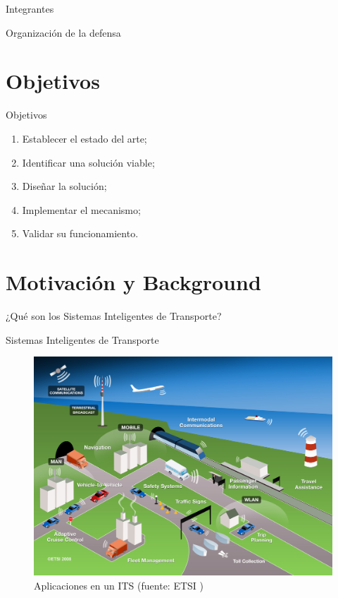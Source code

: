 \documentclass[aspectratio=169]{beamer}
\begin{document}
\begin{frame}{Integrantes}
\begin{minipage}{.5\textwidth}
\end{minipage}    
\end{frame}

\begin{frame}{Organización de la defensa}
\tableofcontents
\note{
    \tableofcontents
}
\end{frame}

\section{Objetivos}
\begin{frame}{Objetivos}
\begin{enumerate}
    \item Establecer el estado del arte;\pause
    \item Identificar una solución viable;\pause
    \item Diseñar la solución;\pause
    \item Implementar el mecanismo;\pause
    \item Validar su funcionamiento.
\end{enumerate}
\end{frame}

\section{Motivación y Background}

\begin{frame}[standout]
\centering
¿Qué son los Sistemas Inteligentes de Transporte?
\end{frame}

\begin{frame}{Sistemas Inteligentes de Transporte}
\begin{figure}
    \centering
    \includegraphics[height=0.8\textheight]{figuras/ITS.png}
    \caption{Aplicaciones en un ITS (fuente: ETSI \autocite{etsi})}
    \label{fig:itsetsi}
\end{figure}
\end{frame}
\end{document}
